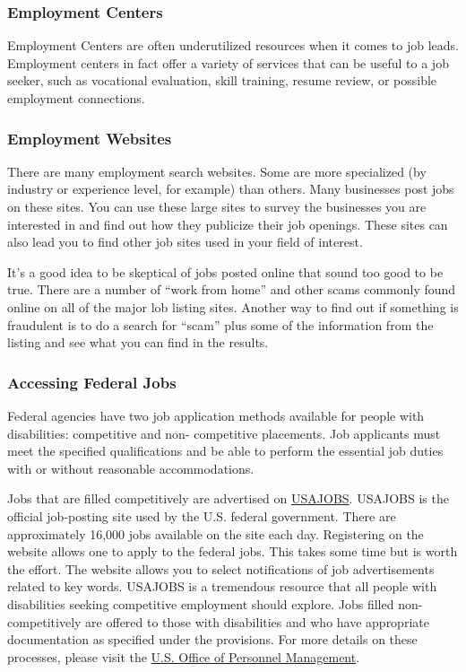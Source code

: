 \subsubsection*{Employment Centers}

Employment Centers are often underutilized resources when it comes to job leads. Employment centers in fact offer a variety of services that can be useful to a job seeker, such as vocational evaluation, skill training, resume review, or possible employment connections.

\subsubsection*{Employment Websites}

There are many employment search websites. Some are more specialized (by industry or experience level, for example) than others. Many businesses post jobs on these sites. You can use these large sites to survey the businesses you are interested in and find out how they publicize their job openings. These sites can also lead you to find other job sites used in your field of interest.

It's a good idea to be skeptical of jobs posted online that sound too good to be true. There are a number of ``work from home'' and other scams commonly found online on all of the major lob listing sites. Another way to find out if something is fraudulent is to do a search for ``scam'' plus some of the information from the listing and see what you can find in the results.
 
\subsubsection*{Accessing Federal Jobs}

Federal agencies have two job application methods available for people with disabilities: competitive and non- competitive placements. Job applicants must meet the specified qualifications and be able to perform the essential job duties with or without reasonable accommodations.

Jobs that are filled competitively are advertised on \href{https://www.usajobs.gov/}{USAJOBS}. USAJOBS is the official job-posting site used by the U.S. federal government. There are approximately 16,000 jobs available on the site each day. Registering on the website allows one to apply to the federal jobs. This takes some time but is worth the effort. The website allows you to select notifications of job advertisements related to key words. USAJOBS is a tremendous resource that all people with disabilities seeking competitive employment should explore. Jobs filled non-competitively are offered to those with disabilities and who have appropriate documentation as specified under the provisions. For more details on these processes, please visit the \href{https://www.opm.gov/policy-data-oversight/disability-employment/faqs/?page=6}{U.S. Office of Personnel Management}.

